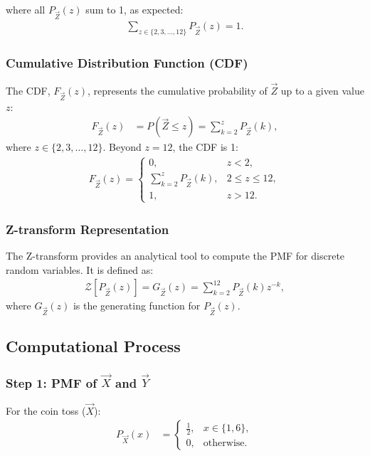 \documentclass[journal]{IEEEtran}
\begin{document}
\noindent where all $P_{\vec{Z}}(z)$ sum to 1, as expected:
\begin{align}
\sum_{z \in \{2, 3, \dots, 12\}} P_{\vec{Z}}(z) = 1.
\end{align}


\subsubsection*{Cumulative Distribution Function (CDF)}
The CDF, $F_{\vec{Z}}(z)$, represents the cumulative probability of $\vec{Z}$ up to a given value $z$:
\begin{align}
F_{\vec{Z}}(z) &= P(\vec{Z} \leq z) = \sum_{k=2}^{z} P_{\vec{Z}}(k),
\end{align}
where $z \in \{2, 3, \dots, 12\}$. Beyond $z = 12$, the CDF is 1:
\begin{align}
F_{\vec{Z}}(z) = 
\begin{cases} 
0, & z < 2, \\
\sum_{k=2}^{z} P_{\vec{Z}}(k), & 2 \leq z \leq 12, \\
1, & z > 12.
\end{cases}
\end{align}

\subsubsection*{Z-transform Representation}
The Z-transform provides an analytical tool to compute the PMF for discrete random variables. It is defined as:
\begin{align}
\mathcal{Z}[P_{\vec{Z}}(z)] = G_{\vec{Z}}(z) = \sum_{k=2}^{12} P_{\vec{Z}}(k) z^{-k},
\end{align}
where $G_{\vec{Z}}(z)$ is the generating function for $P_{\vec{Z}}(z)$.

\subsection*{Computational Process}

\subsubsection*{Step 1: PMF of $\vec{X}$ and $\vec{Y}$}
For the coin toss ($\vec{X}$):
\begin{align}
P_{\vec{X}}(x) &= 
\begin{cases} 
\frac{1}{2}, & x \in \{1, 6\}, \\
0, & \text{otherwise}.
\end{cases}
\end{align}
\end{document}
